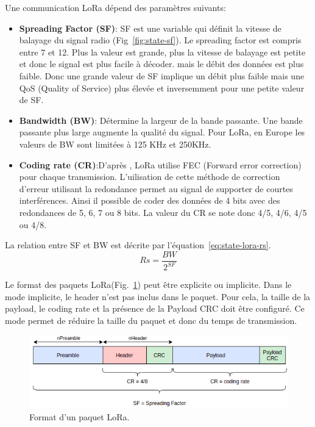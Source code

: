 Une communication LoRa dépend des paramètres suivants:
\begin{itemize}
    \item \textbf{Spreading Factor (SF)}: SF est une variable qui définit la vitesse de balayage du signal radio (Fig~\ref{fig:state-sf}). Le spreading factor est compris entre 7 et 12. Plus la valeur est grande, plus la vitesse de balayage est petite et donc le signal est plus facile à décoder. mais le débit des données est plus faible. Donc une grande valeur de SF implique un débit plus faible mais une QoS (Quality of Service) plus élevée et inversemment pour une petite valeur de SF.
    \item \textbf{Bandwidth (BW)}: Détermine la largeur de la bande passante. Une bande passante plus large augmente la qualité du signal. Pour LoRa, en Europe les valeurs de BW sont limitées à 125 KHz et 250KHz.
    \item \textbf{Coding rate (CR)}:D'après , LoRa utilise FEC (Forward error correction) pour chaque transmission. L'uilisation de cette méthode de correction d'erreur utilisant la redondance permet au signal de supporter de courtes interférences. Ainsi il possible de coder des données de 4 bits avec des redondances de 5, 6, 7 ou 8 bits. La valeur du CR se note donc 
    4/5, 4/6, 4/5 ou 4/8.
\end{itemize}

La relation entre SF et BW est décrite par l'équation~\ref{eq:state-lora-rs}.
\begin{equation}\label{eq:state-lora-rs}
    Rs = \frac{BW}{2^{SF}}
\end{equation}

\vspace{1cm}
Le format des paquets LoRa(Fig.~\ref{fig:state-lora-frame-format}) peut être explicite ou implicite.
Dans le mode implicite, le header n'est pas inclus dans le paquet. Pour cela, la taille de la payload, le coding rate et la présence de la Payload CRC doit être configuré.
Ce mode permet de réduire la taille du paquet et donc du temps de transmission.

\begin{figure}[H]
    \centering
    \includegraphics[scale=0.6]{res/pictures/lora-frame-format.drawio.png}
    \caption{Format d'un paquet LoRa.}
    \label{fig:state-lora-frame-format}
\end{figure}

